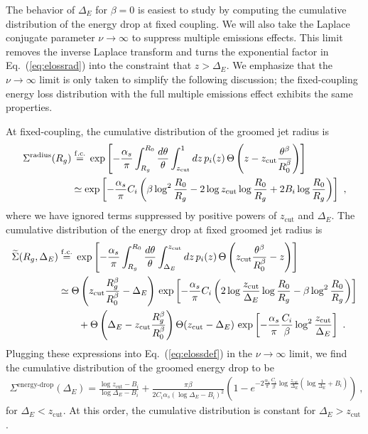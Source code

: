 \documentclass[letterpaper,11pt]{article}
\newcommand{\wideeq}[1]{\makebox[{#1}]{$=$}}
\newcommand{\zcut}{z_\text{cut}}
\DeclareRobustCommand{\Eq}[1]{Eq.~(\ref{#1})}
\begin{document}
The behavior of $\Delta_E$ for $\beta=0$ is easiest to study by computing the cumulative distribution of the energy drop at fixed coupling.  We will also take the Laplace conjugate parameter $\nu\to \infty$ to suppress multiple emissions effects.  This limit removes the inverse Laplace transform and turns the exponential factor in \Eq{eq:elossrad} into the constraint that $z>\Delta_E$.  We emphasize that the $\nu\to \infty$ limit is only taken to simplify the following discussion; the fixed-coupling energy loss distribution with the full multiple emissions effect exhibits the same properties.

At fixed-coupling, the cumulative distribution of the groomed jet radius is
\begin{align}
\Sigma^\text{radius}(R_g)& \overset{\rm f.c.}{\wideeq{0.6cm}}
 \exp\left[ -\frac{\alpha_s}{\pi} \int_{R_g}^{R_0} \frac{d\theta}{\theta} \int_{\zcut}^1 dz \, p_i(z)\,\Theta\left( z- z_\text{cut}\frac{\theta^\beta}{R_0^\beta} \right) \right] \nonumber \\
&\simeq \exp\left[ -\frac{\alpha_s}{\pi} C_i\left( \beta \log^2 \frac{R_0}{R_g} - 2 \log \zcut \log \frac{R_0}{R_g}+2 B_i \log \frac{R_0}{R_g} \right) \right]  \ ,
\end{align}
where we have ignored terms suppressed by positive powers of $\zcut$ and $\Delta_E$.
The cumulative distribution of the energy drop at fixed groomed jet radius is
\begin{align}
\widetilde{\Sigma}(R_g,\Delta_E) &
 \overset{\rm f.c.}{\wideeq{0.6cm}}\exp\left[ -\frac{\alpha_s}{\pi} \int_{R_g}^{R_0} \frac{d\theta}{\theta} \int^{\zcut}_{\Delta_E} dz \, p_i(z) \, \Theta\left( z_\text{cut}\frac{\theta^\beta}{R_0^\beta}-z  \right) \right] \nonumber \\
&\simeq 
\Theta\left( \zcut \frac{R_g^\beta}{R_0^\beta} - \Delta_E  \right) \, \exp\left[   
-\frac{\alpha_s}{\pi}C_i \left( 
2\log \frac{\zcut}{\Delta_E} \log \frac{R_0}{R_g} - \beta \log^2\frac{R_0}{R_g}
\right)
\right] \nonumber \\
&\qquad+
\Theta\left( \Delta_E-\zcut \frac{R_g^\beta}{R_0^\beta} \right)\Theta(\zcut - \Delta_E)\, \exp\left[
-\frac{\alpha_s}{\pi}\frac{C_i}{\beta} \log^2\frac{\zcut}{\Delta_E}
\right]
  \ .
\end{align}
Plugging these expressions into \Eq{eq:elossdef} in the $\nu \to \infty$ limit, we find the cumulative distribution of the groomed energy drop to be
\begin{align}\label{eq:fixacumeloss}
\Sigma^\text{energy-drop}(\Delta_E) = 
\frac{\log \zcut - B_i}{\log \Delta_E - B_i}
+\frac{\pi \beta}{2 C_i \alpha_s (\log\Delta_E - B_i)^2} 
\left(1-e^{-2\frac{\alpha_s}{\pi}\frac{C_i}{\beta}\log\frac{\zcut}{\Delta_E}\left(\log \frac{1}{\Delta_E} + B_i\right)}
\right)
\ ,
\end{align}
for $\Delta_E<\zcut$.  At this order, the cumulative distribution is constant for $\Delta_E > \zcut$.
\end{document}
